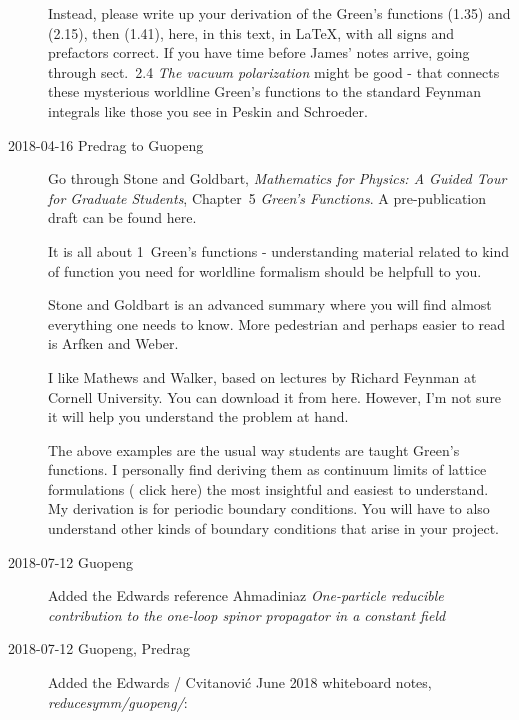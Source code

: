 \begin{description}
Instead, please write up your derivation of the Green's functions (1.35)
and (2.15), then (1.41), here, in this text, in LaTeX, with all signs and
prefactors correct. If you have time before James' notes arrive, going
through sect.~2.4 {\em The vacuum polarization} might be good - that
connects these mysterious worldline Green's functions to the standard
Feynman integrals like those you see in Peskin and Schroeder.

\item[2018-04-16 Predrag to Guopeng]
Go through
Stone and Goldbart, {\em Mathematics for Physics: A Guided Tour
for Graduate Students}, Chapter~5  \emph{Green's Functions}.
A pre-publication draft can be found
{here}.

It is all about 1\dmn\ Green's functions - understanding material related to
kind of function you need for worldline formalism should be helpfull to you.

Stone and Goldbart is an advanced summary where you will find
almost everything one needs to know. More pedestrian and perhaps easier to
read is Arfken and Weber.

I like Mathews and Walker, based on lectures by Richard
Feynman at Cornell University. You can download it from
{here}. However, I'm not sure it will help you understand the problem at
hand.

The above examples are the usual way students are taught Green's functions. I
personally find deriving them as continuum limits of lattice formulations
(
{click here}) the most insightful and easiest to understand. My derivation
is for periodic boundary conditions. You will have to also understand other kinds of
boundary conditions that arise in your project.

\item[2018-07-12 Guopeng]
Added the Edwards reference
Ahmadiniaz \etal{}
{\em One-particle reducible contribution to the one-loop spinor propagator in a constant field}

\item[2018-07-12 Guopeng, Predrag]
Added the Edwards / Cvitanovi\'c June 2018 whiteboard notes, \emph{reducesymm/guopeng/}:


\end{description}
